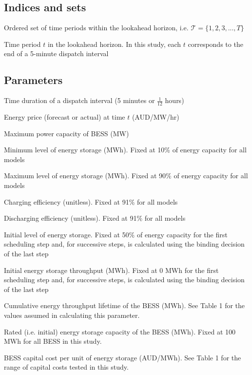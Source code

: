 \documentclass[12pt,a4paper,]{report}
\begin{document}
\hypertarget{indices-and-sets-1}{%
\subsection{Indices and sets}\label{indices-and-sets-1}}

\begin{description}[leftmargin=8em,style=nextline]
  \item[$\mathcal{T}$] Ordered set of time periods within the lookahead horizon, i.e. $\mathcal{T} = \{1, 2, 3, ..., T\}$
  \item[$t \in \mathcal{T}$] Time period $t$ in the lookahead horizon. In this study, each $t$ corresponds to the end of a 5-minute dispatch interval
\end{description}

\hypertarget{parameters}{%
\subsection{Parameters}\label{parameters}}

\begin{description}[leftmargin=8em,style=nextline]
  \item[$\tau$] Time duration of a dispatch interval (5 minutes or $\frac{1}{12}$ hours)
  \item[$\lambda_t$] Energy price (forecast or actual) at time $t$ (AUD/MW/hr)
  \item[$\bar{p}$] Maximum power capacity of BESS (MW)
  \item[$\underline{e}$] Minimum level of energy storage (MWh). Fixed at 10\% of energy capacity for all models
  \item[$\bar{e}$] Maximum level of energy storage (MWh). Fixed at 90\% of energy capacity for all models
  \item[$\eta_{\textrm{charge}}$] Charging efficiency (unitless). Fixed at 91\% for all models
  \item[$\eta_{\textrm{discharge}}$] Discharging efficiency (unitless). Fixed at 91\% for all models
  \item[$e_0$] Initial level of energy storage. Fixed at 50\% of energy capacity for the first scheduling step and, for successive steps, is calculated using the binding decision of the last step
  \item[$d_0$] Initial energy storage throughput (MWh). Fixed at 0 MWh for the first scheduling step and, for successive steps, is calculated using the binding decision of the last step
  \item[$d_{\textrm{lifetime}}$] Cumulative energy throughput lifetime of the BESS (MWh). See Table 1 for the values assumed in calculating this parameter.
  \item[$e_{\textrm{rated}}$] Rated (i.e. initial) energy storage capacity of the BESS (MWh). Fixed at 100 MWh for all BESS in this study.
  \item[$c_{\textrm{capital}}$] BESS capital cost per unit of energy storage (AUD/MWh). See Table 1 for the range of capital costs tested in this study.
\end{description}
\end{document}

